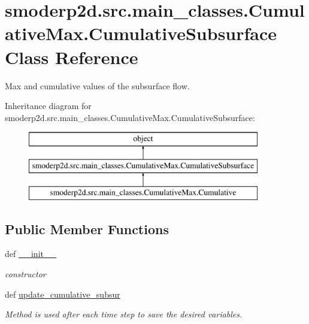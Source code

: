 \hypertarget{classsmoderp2d_1_1src_1_1main__classes_1_1CumulativeMax_1_1CumulativeSubsurface}{\section{smoderp2d.\-src.\-main\-\_\-classes.\-Cumulative\-Max.\-Cumulative\-Subsurface Class Reference}
\label{classsmoderp2d_1_1src_1_1main__classes_1_1CumulativeMax_1_1CumulativeSubsurface}
}


Max and cumulative values of the subsurface flow.  


Inheritance diagram for smoderp2d.\-src.\-main\-\_\-classes.\-Cumulative\-Max.\-Cumulative\-Subsurface\-:\begin{figure}[H]
\begin{center}
\leavevmode
\includegraphics[height=3.000000cm]{d2/dc1/classsmoderp2d_1_1src_1_1main__classes_1_1CumulativeMax_1_1CumulativeSubsurface}
\end{center}
\end{figure}
\subsection*{Public Member Functions}
\begin{DoxyCompactItemize}
\item 
\hypertarget{classsmoderp2d_1_1src_1_1main__classes_1_1CumulativeMax_1_1CumulativeSubsurface_a1c6651aa035dc033023bd0e88a7b795c}{def \hyperlink{classsmoderp2d_1_1src_1_1main__classes_1_1CumulativeMax_1_1CumulativeSubsurface_a1c6651aa035dc033023bd0e88a7b795c}{\-\_\-\-\_\-init\-\_\-\-\_\-}}\label{classsmoderp2d_1_1src_1_1main__classes_1_1CumulativeMax_1_1CumulativeSubsurface_a1c6651aa035dc033023bd0e88a7b795c}

\begin{DoxyCompactList}\small\item\em constructor \end{DoxyCompactList}\item 
def \hyperlink{classsmoderp2d_1_1src_1_1main__classes_1_1CumulativeMax_1_1CumulativeSubsurface_a1cd15ec0c1b0a48ea407bededae616f1}{update\-\_\-cumulative\-\_\-subsur}
\begin{DoxyCompactList}\small\item\em Method is used after each time step to save the desired variables. \end{DoxyCompactList}\end{DoxyCompactItemize}
